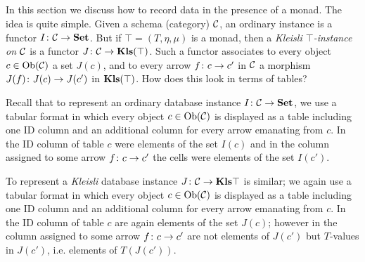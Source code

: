 
\subsection{}\label{sec:monads in db}

In this section we discuss how to record data in the presence of a monad. The idea is quite simple. Given a schema (category) $\mathcal{C}$, an ordinary instance is a functor $I\colon\mathcal{C}\rightarrow{\bf Set}$. But if $\top=(T,\eta,\mu)$ is a monad, then a {\em Kleisli $\top$-instance on $\mathcal{C}$} is a functor $J\colon\mathcal{C}\rightarrow{\bf Kls}(\top)$. Such a functor associates to every object $c\in\textnormal{Ob}(\mathcal{C})$ a set $J(c)$, and to every arrow $f\colon c\rightarrow c'$ in $\mathcal{C}$ a morphism $J(f)\colon J(c)\rightarrow J(c')$ in ${\bf Kls}(\top)$. How does this look in terms of tables?

Recall that to represent an ordinary database instance $I\colon\mathcal{C}\rightarrow{\bf Set}$, we use a tabular format in which every object $c\in\textnormal{Ob}(\mathcal{C})$ is displayed as a table including one ID column and an additional column for every arrow emanating from $c$. In the ID column of table $c$ were elements of the set $I(c)$ and in the column assigned to some arrow $f\colon c\rightarrow c'$ the cells were elements of the set $I(c')$. 

To represent a {\em Kleisli} database instance $J\colon\mathcal{C}\rightarrow{\bf Kls}{\top}$ is similar; we again use a tabular format in which every object $c\in\textnormal{Ob}(\mathcal{C})$ is displayed as a table including one ID column and an additional column for every arrow emanating from $c$. In the ID column of table $c$ are again elements of the set $J(c)$; however in the column assigned to some arrow $f\colon c\rightarrow c'$ are not elements of $J(c')$ but $T$-values in $J(c')$, i.e. elements of $T(J(c'))$. 

